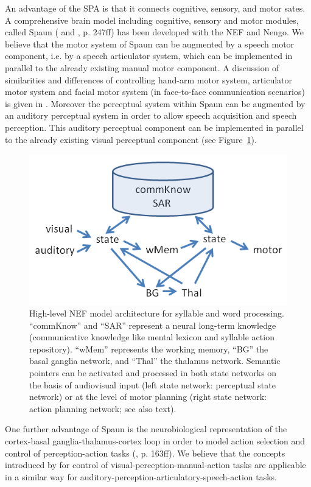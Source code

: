 \documentclass[conference]{IEEEtran}
\begin{document}
An advantage of the SPA is that it connects cognitive,
sensory, and motor sates. A comprehensive brain model including
cognitive, sensory and motor modules, called Spaun
(\cite{eliasmith2012} and \cite{eliasmith2013}, p. 247ff) has been
developed with the NEF and Nengo. We believe that the motor system of Spaun
can be augmented by a speech motor component, i.e. by a speech
articulator system, which can be implemented in parallel to the
already existing manual motor component. A discussion of similarities
and differences of controlling hand-arm motor system, articulator
motor system and facial motor system (in face-to-face communication
scenarios) is given in \cite{kroger2010}. Moreover the perceptual
system within Spaun can be augmented by an auditory perceptual system
in order to allow speech acquisition and speech perception. This
auditory perceptual component can be implemented in parallel to the
already existing visual perceptual component (see
Figure~\ref{fig:model}).

\begin{figure}[!t]
\centering
\includegraphics[width=\columnwidth]{model}
\caption{High-level NEF model architecture for syllable and word processing.
  ``commKnow'' and ``SAR'' represent a neural long-term knowledge
  (communicative knowledge like mental lexicon and syllable action
  repository). ``wMem'' represents the working memory, ``BG'' the
  basal ganglia network, and ``Thal'' the thalamus
  network. Semantic pointers can be activated and processed in both
  state networks on the basis of audiovisual input (left state
  network: perceptual state network) or at the level of motor planning
  (right state network: action planning network; see also text).}
\label{fig:model}
\end{figure}

One further advantage of Spaun is the neurobiological representation
of the cortex-basal ganglia-thalamus-cortex loop in order to model
action selection and control of perception-action tasks
(\cite{eliasmith2013}, p. 163ff). We believe that the concepts
introduced by \cite{eliasmith2013} for control of
visual-perception-manual-action tasks are applicable in a similar way
for auditory-perception-articulatory-speech-action tasks.
\end{document}
